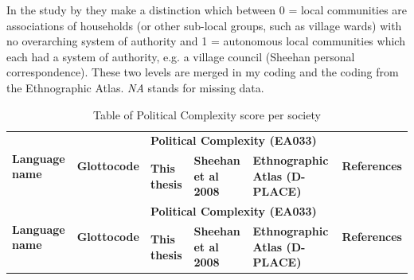 \documentclass[a4paper,10pt]{article} %
\begin{document}
In the study by \cite{sheehan2018coevolution} they make a distinction which between 0 = local communities are associations of households (or other sub-local groups, such as village wards) with no overarching system of authority and 1 = autonomous local communities which each had a system of authority, e.g. a village council (Sheehan personal correspondence). These two levels are merged in my coding and the coding from the Ethnographic Atlas. \emph{NA} stands for missing data.

\begin{landscape}
\begin{longtable}{ | p{2cm}| p{2cm}| p{1.8cm}| p{1.8cm}| p{3cm}| p{9cm}| }

\caption{{Table of Political Complexity score per society}} 
\label{pol_complex_table}\\
\hline
\multirow{2}{*}{\parbox{2cm}{\textbf{Language name}}} &\multirow{2}{*}{\textbf{Glottocode}}&  \multicolumn{3}{p{6.6cm}|}{\textbf{Political Complexity (EA033)}} & \multirow{2}{*}{\textbf{References}} \\ \cline{3-5}
&& \textbf{This thesis}& \textbf{Sheehan et al 2008}& \textbf{Ethnographic Atlas (D-PLACE)}&\\ \hline




\endfirsthead

\hline
\multirow{2}{*}{\parbox{2cm}{\textbf{Language name}}} &\multirow{2}{*}{\textbf{Glottocode}}&  \multicolumn{3}{p{6.6cm}|}{\textbf{Political Complexity (EA033)}} & \multirow{2}{*}{\textbf{References}} \\ \cline{3-5}
&& \textbf{This thesis}& \textbf{Sheehan et al 2008}& \textbf{Ethnographic Atlas (D-PLACE)}&\\ \hline

\endhead


\end{longtable}
\end{landscape}
\end{document}
